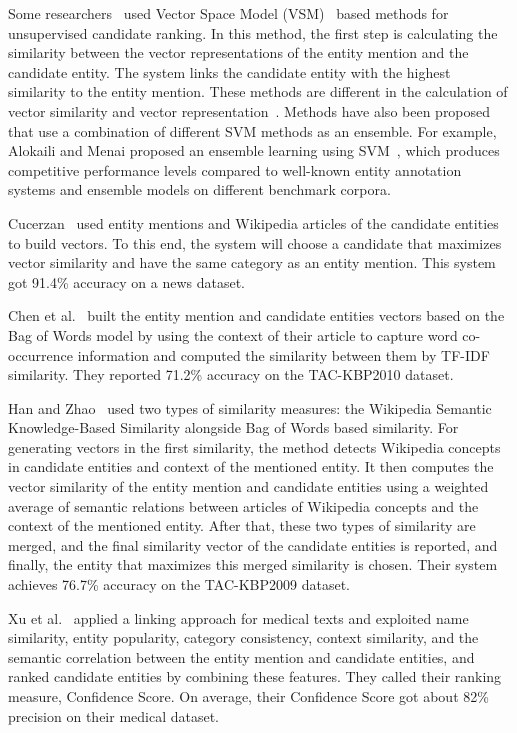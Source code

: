 \documentclass{article}
\begin{document}
Some researchers~\cite{chen2010cuny,cucerzan2007large,han2009nlpr_kbp,xu2018unsupervised} used Vector Space Model (VSM)~\cite{salton1975vector} based methods for unsupervised candidate ranking. In this method, the first step is calculating the similarity between the vector representations of the entity mention and the candidate entity. The system links the candidate entity with the highest similarity to the entity mention. These methods are different in the calculation of vector similarity and vector representation~\cite{shen2014entity}. Methods have also been proposed that use a combination of different SVM methods as an ensemble. For example, Alokaili and Menai proposed an ensemble learning using SVM~\cite{alokaili2020svm}, which produces competitive performance levels compared to well-known entity annotation systems and ensemble models on different benchmark corpora.

Cucerzan~\cite{cucerzan2007large} used entity mentions and Wikipedia articles of the candidate entities to build vectors. To this end, the system will choose a candidate that maximizes vector similarity and have the same category as an entity mention. This system got 91.4\%  accuracy on a news dataset.

Chen et al.~\cite{chen2010cuny} built the entity mention and candidate entities vectors based on the Bag of Words model by using the context of their article to capture word co-occurrence information and computed the similarity between them by TF-IDF similarity. They reported 71.2\%  accuracy on the TAC-KBP2010 dataset.

Han and Zhao~\cite{han2009nlpr_kbp} used two types of similarity measures: the Wikipedia Semantic Knowledge-Based Similarity alongside Bag of Words based similarity. For generating vectors in the first similarity, the method detects Wikipedia concepts in candidate entities and context of the mentioned entity. It then computes the vector similarity of the entity mention and candidate entities using a weighted average of semantic relations between articles of Wikipedia concepts and the context of the mentioned entity. After that, these two types of similarity are merged, and the final similarity vector of the candidate entities is reported, and finally, the entity that maximizes this merged similarity is chosen. Their system achieves 76.7\%  accuracy on the TAC-KBP2009 dataset.

Xu et al.~\cite{xu2018unsupervised} applied a linking approach for medical texts and exploited name similarity, entity popularity, category consistency, context similarity, and the semantic correlation between the entity mention and candidate entities, and ranked candidate entities by combining these features. They called their ranking measure, Confidence Score. On average, their Confidence Score got about 82\%  precision on their medical dataset.
\end{document}
